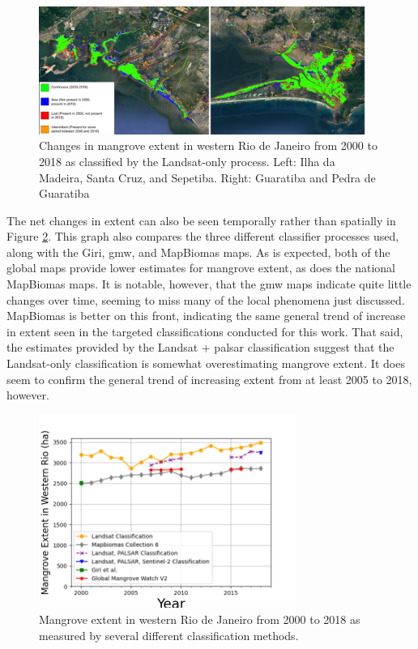 \begin{figure}[!htb] 
\centering
\includegraphics[width=0.95\textwidth]{Figures/chap4/extent_changes.png}
\caption[Changes in Mangrove Extent 2000-2018]{Changes in mangrove extent in western Rio de Janeiro from 2000 to 2018 as classified by the Landsat-only process. Left: Ilha da Madeira, Santa Cruz, and Sepetiba. Right: Guaratiba and Pedra de Guaratiba}
\label{fig:extent-changes}
\end{figure}

The net changes in extent can also be seen temporally rather than spatially in Figure \ref{fig:extent-over-time}. This graph also compares the three different classifier processes used, along with the Giri, \ac{gmw}, and MapBiomas maps. As is expected, both of the global maps provide lower estimates for mangrove extent, as does the national MapBiomas maps. It is notable, however, that the \ac{gmw} maps indicate quite little changes over time, seeming to miss many of the local phenomena just discussed. MapBiomas is better on this front, indicating the same general trend of increase in extent seen in the targeted classifications conducted for this work. That said, the estimates provided by the Landsat + \ac{palsar} classification suggest that the Landsat-only classification is somewhat overestimating mangrove extent. It does seem to confirm the general trend of  increasing extent from at least 2005 to 2018, however.  

\begin{figure}[!htb] 
\centering
\includegraphics[width=0.75\textwidth]{Figures/chap4/extent_over_time.png}
\caption[Mangrove Extent Over Time]{Mangrove extent in western Rio de Janeiro from 2000 to 2018 as measured by several different classification methods.}
\label{fig:extent-over-time}
\end{figure}

